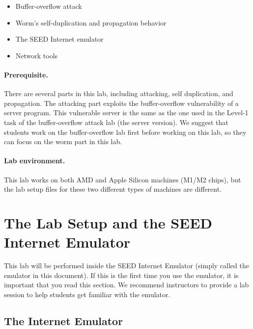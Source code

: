 \begin{itemize}[noitemsep]
\item Buffer-overflow attack
\item Worm's self-duplication and propagation behavior
\item The SEED Internet emulator 
\item Network tools 
\end{itemize}


\paragraph{Prerequisite.} 
There are several parts in this lab, including attacking, self duplication, and 
propagation. The attacking part exploits the buffer-overflow vulnerability
of a server program. This vulnerable server is the same as 
the one used in the Level-1 task of the buffer-overflow attack 
lab (the server version). We suggest that students 
work on the buffer-overflow lab first before working on this lab,
so they can focus on the worm part in this lab.


\paragraph{Lab environment.} 
\seedenvironmentB
\nodependency

This lab works on both AMD and Apple Silicon machines (M1/M2 chips),
but the lab setup files for these two different types of machines 
are different. 

\section{The Lab Setup and the SEED Internet Emulator}
\label{sec:emulator}

This lab will be performed inside the SEED Internet Emulator (simply
called the emulator in this document). If this is the first time you
use the emulator, it is important that you read this section. 
We recommend instructors to provide a lab session to 
help students get familiar with the emulator.  


\subsection{The Internet Emulator} 

